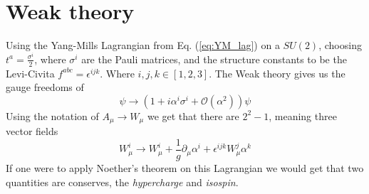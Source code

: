 \documentclass[12pt, a4paper]{book}
\begin{document}
\section{Weak theory}
Using the Yang-Mills Lagrangian from Eq. (\ref{eq:YM_lag}) on a $SU(2)$, choosing $t^a =\frac{\sigma^i}{2}$, where $\sigma^i$ are the Pauli matrices, and the structure constants to be the Levi-Civita $f^{abc}=\epsilon^{ijk}$. Where $i,j,k\in[1,2,3]$.
The Weak theory gives us the gauge freedoms of
$$
\psi \rightarrow \left(1+i \alpha^i \sigma^i + \mathcal{O}(\alpha^2)\right) \psi
$$ 
Using the notation of $A_\mu\rightarrow W_\mu$ we get that there are $2^2-1$, meaning three vector fields 
$$
W_\mu^i \rightarrow W^i_\mu +\frac{1}{g}\partial_\mu\alpha^i +\epsilon^{ijk}W_\mu^j\alpha^k
$$
If one were to apply Noether's theorem on this Lagrangian we would get that two quantities are conserves, the \textit{hypercharge} and \textit{isospin}.
\end{document}
